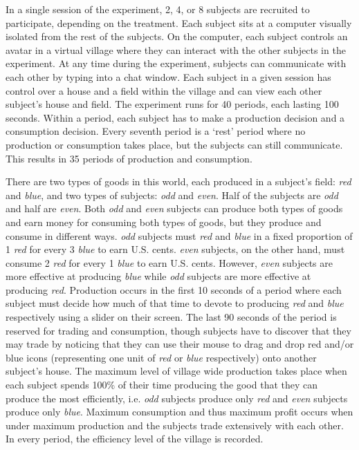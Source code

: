 \documentclass[graybox]{svmult}
\begin{document}
In a single session of the experiment, 2, 4, or 8 subjects are recruited to participate, depending on the treatment. Each subject sits at a computer visually isolated from the rest of the subjects.  On the computer, each subject controls an avatar in a virtual village where they can interact with the other subjects in the experiment.  At any time during the experiment, subjects can communicate with each other by typing into a chat window. Each subject in a given session has control over a house and a field within the village and can view each other subject's house and field.  The experiment runs for 40 periods, each lasting 100 seconds.  Within a period, each subject has to make a production decision and a consumption decision.  Every seventh period is a `rest' period where no production or consumption takes place, but the subjects can still communicate.  This results in 35 periods of production and consumption.

There are two types of goods in this world, each produced in a subject's field: {\it red} and {\it blue}, and two types of subjects: {\it odd} and {\it even}.  Half of the subjects are {\it odd} and half are {\it even}.  Both {\it odd} and {\it even} subjects can produce both types of goods and earn money for consuming both types of goods, but they produce and consume in different ways.  {\it odd} subjects must {\it red} and {\it blue} in a fixed proportion of 1 {\it red} for every 3 {\it blue} to earn U.S. cents. {\it even} subjects, on the other hand, must consume 2 {\it red} for every 1 {\it blue} to earn U.S. cents. However, {\it even} subjects are more effective at producing {\it blue} while {\it odd} subjects are more effective at producing {\it red}. Production occurs in the first 10 seconds of a period where each subject must decide how much of that time to devote to producing {\it red} and {\it blue} respectively using a slider on their screen. The last 90 seconds of the period is reserved for trading and consumption, though subjects have to discover that they may trade by noticing that they can use their mouse to drag and drop red and/or blue icons (representing one unit of {\it red} or {\it blue} respectively) onto another subject's house.  The maximum level of village wide production takes place when each subject spends 100\% of their time producing the good that they can produce the most efficiently, i.e. {\it odd} subjects produce only {\it red} and {\it even} subjects produce only {\it blue}.  Maximum consumption and thus maximum profit occurs when under maximum production and the subjects trade extensively with each other. In every period, the efficiency level of the village is recorded. 
\end{document}
